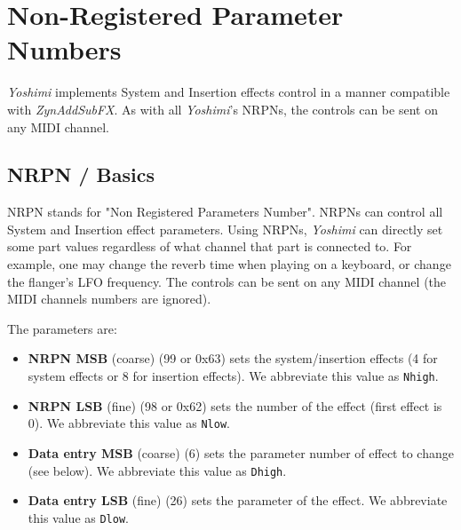 %
%
%

\section{Non-Registered Parameter Numbers}
\label{sec:nrpns}

   \textsl{Yoshimi} implements System and Insertion effects control in a
   manner compatible with \textsl{ZynAddSubFX}. As with all
   \textsl{Yoshimi}'s NRPNs, the controls can be sent on any MIDI channel.

\subsection{NRPN / Basics}
\label{subsection:nrpns_midi_nrpn_basics}

   NRPN stands for "Non Registered Parameters Number".
   NRPNs can control all System and Insertion effect parameters.
   Using NRPNs, \textsl{Yoshimi} can directly set some part values
   regardless of what channel that part is connected to.  For example, one
   may change the reverb time when playing on a keyboard, or
   change the flanger's LFO frequency.
   The controls can be sent on any MIDI channel
   (the MIDI channels numbers are ignored).

   The parameters are:

   \begin{itemize}
      \item \textbf{NRPN MSB}
      (coarse) (99 or 0x63) sets the system/insertion effects
      (4 for system effects or 8 for insertion effects).
      We abbreviate this value as \texttt{Nhigh}.
      \item \textbf{NRPN LSB}
      (fine) (98 or 0x62) sets the number of the effect (first
      effect is 0).
      We abbreviate this value as \texttt{Nlow}.
      \item \textbf{Data entry MSB}
      (coarse) (6) sets the parameter number of effect to
      change (see below).
      We abbreviate this value as \texttt{Dhigh}.
      \item \textbf{Data entry LSB}
      (fine) (26) sets the parameter of the effect.
      We abbreviate this value as \texttt{Dlow}.
   \end{itemize}

